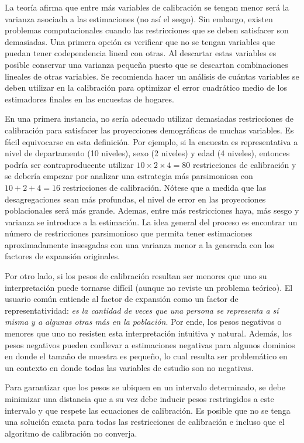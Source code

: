\documentclass[
  12pt,
]{book}
\begin{document}
La teoría afirma que entre más variables de calibración se tengan menor será la varianza asociada a las estimaciones (no así el sesgo). Sin embargo, existen problemas computacionales cuando las restricciones que se deben satisfacer son demasiadas. Una primera opción es verificar que no se tengan variables que puedan tener codependencia lineal con otras. Al descartar estas variables es posible conservar una varianza pequeña puesto que se descartan combinaciones lineales de otras variables. Se recomienda hacer un análisis de cuántas variables se deben utilizar en la calibración para optimizar el error cuadrático medio de los estimadores finales en las encuestas de hogares.

En una primera instancia, no sería adecuado utilizar demasiadas restricciones de calibración para satisfacer las proyecciones demográficas de muchas variables. Es fácil equivocarse en esta definición. Por ejemplo, si la encuesta es representativa a nivel de departamento (10 niveles), sexo (2 niveles) y edad (4 niveles), entonces podría ser contraproducente utilizar \(10 \times 2 \times 4 = 80\) restricciones de calibración y se debería empezar por analizar una estrategia más parsimoniosa con \(10 + 2 + 4 = 16\) restricciones de calibración. Nótese que a medida que las desagregaciones sean más profundas, el nivel de error en las proyecciones poblacionales será más grande. Ademas, entre más restricciones haya, más sesgo y varianza se introduce a la estimación. La idea general del proceso es encontrar un número de restricciones parsimonioso que permita tener estimaciones aproximadamente insesgadas con una varianza menor a la generada con los factores de expansión originales.

Por otro lado, si los pesos de calibración resultan ser menores que uno su interpretación puede tornarse difícil (aunque no reviste un problema teórico). El usuario común entiende al factor de expansión como un factor de representatividad: \emph{es la cantidad de veces que una persona se representa a sí misma y a algunas otras más en la población}. Por ende, los pesos negativos o menores que uno no resisten esta interpretación intuitiva y natural. Además, los pesos negativos pueden conllevar a estimaciones negativas para algunos dominios en donde el tamaño de muestra es pequeño, lo cual resulta ser problemático en un contexto en donde todas las variables de estudio son no negativas.

Para garantizar que los pesos se ubiquen en un intervalo determinado, se debe minimizar una distancia que a su vez debe inducir pesos restringidos a este intervalo y que respete las ecuaciones de calibración. Es posible que no se tenga una solución exacta para todas las restricciones de calibración e incluso que el algoritmo de calibración no converja.
\end{document}
